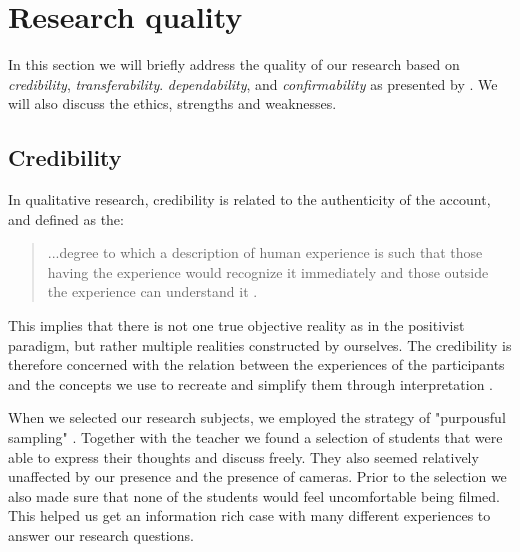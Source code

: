 


\section{Research quality}
In this section we will briefly address the quality of our research based on \emph{credibility}, \emph{transferability}. \emph{dependability}, and \emph{confirmability} as presented by \citet{baxter1997evaluating}. We will also discuss the ethics, strengths and weaknesses. 

\subsection{Credibility}
In qualitative research, credibility is related to the authenticity of the account, and defined as the: \begin{quote}...degree to which a description of human experience is such that those having the experience would recognize it immediately and those outside the experience can understand it \citetext{\citealp{lincoln1985naturalistic}, referenced in \citealp{baxter1997evaluating}}.\end{quote}

This implies that there is not one true objective reality as in the positivist paradigm, but rather multiple realities constructed by ourselves. The credibility is therefore concerned with the relation between the experiences of the participants and the concepts we use to recreate and simplify them through interpretation \citep{baxter1997evaluating}.

When we selected our research subjects, we employed the strategy of "purpousful sampling" \citep{baxter1997evaluating}. Together with the teacher we found a selection of students that were able to express their thoughts and discuss freely. They also seemed relatively unaffected by our presence and the presence of cameras. Prior to the selection we also made sure that none of the students would feel uncomfortable being filmed. This helped us get an information rich case with many different experiences to answer our research questions. 

